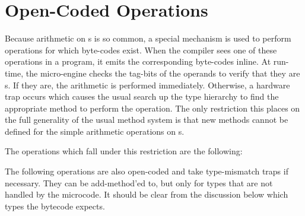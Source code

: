 

\section{Open-Coded Operations}

Because arithmetic on s is so common, a special mechanism
is used to perform operations for which byte-codes exist.  When the
compiler sees one of these operations in a program, it emits the
corresponding byte-codes inline. At run-time, the micro-engine checks
the tag-bits of the operands to verify that they are s.  If
they are, the arithmetic is performed immediately.  Otherwise, a
hardware trap occurs which causes the usual search up the type
hierarchy to find the appropriate method to perform the operation.
The only restriction this places on the full generality of the usual
method system is that new methods cannot be defined for the simple
arithmetic operations on s.

The operations which fall under this restriction are the following:



The following operations are also open-coded and take type-mismatch
traps if necessary.  They can be add-method'ed to, but only for types
that are not handled by the microcode.  It should be clear from the
discussion below which types the bytecode expects.



